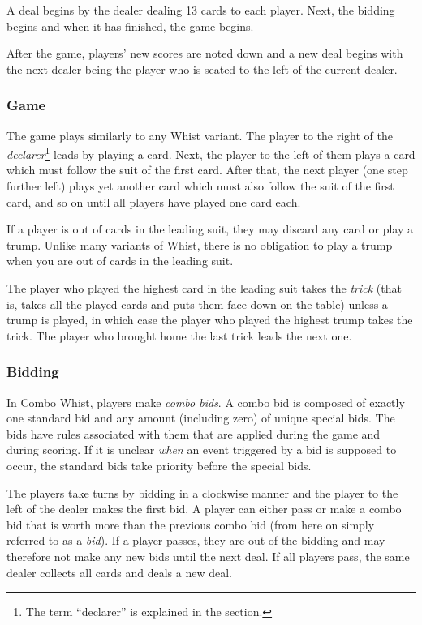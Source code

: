 \documentclass[a4paper]{article}
\begin{document}
			A deal begins by the dealer dealing 13 cards to each player. Next, the bidding begins and when it has finished, the game begins.

			After the game, players' new scores are noted down and a new deal begins with the next dealer being the player who is seated to the left of the current dealer.

			\subsubsection{Game}
				The game plays similarly to any Whist variant. The player to the right of the \emph{declarer}\footnote{The term ``declarer'' is explained in the \textit{} section.} leads by playing a card. Next, the player to the left of them plays a card which must follow the suit of the first card. After that, the next player (one step further left) plays yet another card which must also follow the suit of the first card, and so on until all players have played one card each.

				If a player is out of cards in the leading suit, they may discard any card or play a trump. Unlike many variants of Whist, there is no obligation to play a trump when you are out of cards in the leading suit.

				The player who played the highest card in the leading suit takes the \emph{trick} (that is, takes all the played cards and puts them face down on the table) unless a trump is played, in which case the player who played the highest trump takes the trick. The player who brought home the last trick leads the next one.

			\subsubsection{Bidding}
				\label{sec:bidding}
				In Combo Whist, players make \emph{combo bids}. A combo bid is composed of exactly one standard bid and any amount (including zero) of unique special bids. The bids have rules associated with them that are applied during the game and during scoring. If it is unclear \emph{when} an event triggered by a bid is supposed to occur, the standard bids take priority before the special bids.

				The players take turns by bidding in a clockwise manner and the player to the left of the dealer makes the first bid. A player can either pass or make a combo bid that is worth more than the previous combo bid (from here on simply referred to as a \emph{bid}). If a player passes, they are out of the bidding and may therefore not make any new bids until the next deal. If all players pass, the same dealer collects all cards and deals a new deal.
\end{document}

